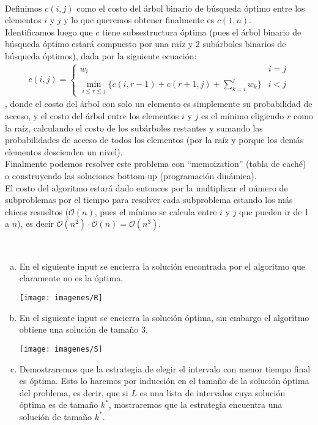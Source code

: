 \documentclass[dcc,uchile]{fcfmcourse}
\theoremstyle{plain}
\theoremstyle{definition}
\begin{document}
\newpage

\begin{problems}
\\
Definimos $c(i,j)$ como el costo del árbol binario de búsqueda óptimo entre los elementos $i$ y $j$ y lo que queremos obtener finalmente es $c(1,n)$.\\

Identificamos luego que $c$ tiene subsestructura óptima (pues el árbol binario de búsqueda óptimo estará compuesto por una raíz y 2 subárboles binarios de búsqueda óptimos), dada por la siguiente ecuación:
\begin{align*}
    c(i,j) =  \begin{cases} 
      w_{i} & i = j\\
      \min_{i\le r\le j}\{c(i,r-1)+c(r+1,j) + \sum_{k=i}^j w_{k}\} & i < j
   \end{cases}
\end{align*}
, donde el costo del árbol con solo un elemento es simplemente su probabilidad de acceso, y el costo del árbol entre los elementos $i$ y $j$ es el mínimo eligiendo $r$ como la raíz, calculando el costo de los subárboles restantes y sumando las probabilidades de acceso de todos los elementos (por la raíz y porque los demás elementos descienden un nivel).\\

Finalmente podemos resolver este problema con ``memoization'' (tabla de caché) o construyendo las soluciones bottom-up (programación dinámica).\\
El costo del algoritmo estará dado entonces por la multiplicar el número de subproblemas por el tiempo para resolver cada subproblema estando los más chicos resueltos ($\mathcal{O}(n)$, pues el mínimo se calcula entre $i$ y $j$ que pueden ir de 1 a $n$), es decir $\mathcal{O}(n^2) \cdot \mathcal{O}(n) = \mathcal{O}(n^3)$.


\\
\begin{enumerate}[a)]
    \item En el siguiente input se encierra la solución encontrada por el algoritmo que claramente no es la óptima.
    \begin{center}
        \texttt{[image: imagenes/R]}
    \end{center}
    \item En el siguiente input se encierra la solución óptima, sin embargo el algoritmo obtiene una solución de tamaño 3.
    \begin{center}
        \texttt{[image: imagenes/S]}
    \end{center}
    \item Demostraremos que la estrategia de elegir el intervalo con menor tiempo final es óptima. Esto lo haremos por inducción en el tamaño de la solución óptima del problema, es decir, que si $L$ es una lista de intervalos cuya solución óptima es de tamaño $k^*$, mostraremos que la estrategia encuentra una solución de tamaño $k^*$.\\
    

\end{enumerate}
\end{problems}
\end{document}
